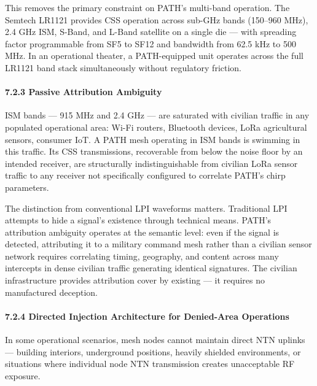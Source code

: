 \documentclass[
  11pt,
]{article}
\begin{document}
This removes the primary constraint on PATH's multi-band operation. The
Semtech LR1121 provides CSS operation across sub-GHz bands (150--960
MHz), 2.4 GHz ISM, S-Band, and L-Band satellite on a single die --- with
spreading factor programmable from SF5 to SF12 and bandwidth from 62.5
kHz to 500 MHz. In an operational theater, a PATH-equipped unit operates
across the full LR1121 band stack simultaneously without regulatory
friction.

\hypertarget{passive-attribution-ambiguity}{%
\paragraph{7.2.3 Passive Attribution
Ambiguity}\label{passive-attribution-ambiguity}}

ISM bands --- 915 MHz and 2.4 GHz --- are saturated with civilian
traffic in any populated operational area: Wi-Fi routers, Bluetooth
devices, LoRa agricultural sensors, consumer IoT. A PATH mesh operating
in ISM bands is swimming in this traffic. Its CSS transmissions,
recoverable from below the noise floor by an intended receiver, are
structurally indistinguishable from civilian LoRa sensor traffic to any
receiver not specifically configured to correlate PATH's chirp
parameters.

The distinction from conventional LPI waveforms matters. Traditional LPI
attempts to hide a signal's existence through technical means. PATH's
attribution ambiguity operates at the semantic level: even if the signal
is detected, attributing it to a military command mesh rather than a
civilian sensor network requires correlating timing, geography, and
content across many intercepts in dense civilian traffic generating
identical signatures. The civilian infrastructure provides attribution
cover by existing --- it requires no manufactured deception.

\hypertarget{directed-injection-architecture-for-denied-area-operations}{%
\paragraph{7.2.4 Directed Injection Architecture for Denied-Area
Operations}\label{directed-injection-architecture-for-denied-area-operations}}

In some operational scenarios, mesh nodes cannot maintain direct NTN
uplinks --- building interiors, underground positions, heavily shielded
environments, or situations where individual node NTN transmission
creates unacceptable RF exposure.
\end{document}
